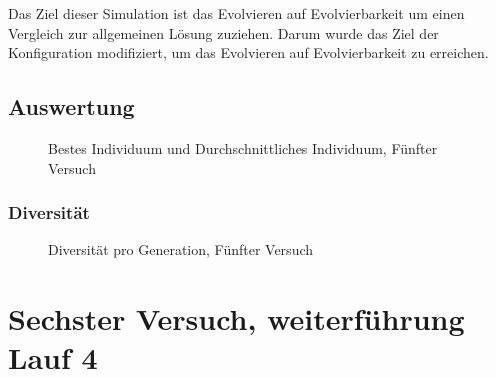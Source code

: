         Das Ziel dieser Simulation ist das Evolvieren auf Evolvierbarkeit um einen Vergleich zur allgemeinen Lösung zuziehen.
        Darum wurde das Ziel der Konfiguration modifiziert, um das Evolvieren auf Evolvierbarkeit zu erreichen.

      \subsection{Auswertung\label{sub:fifthAuswertung}}

        \begin{figure}[H]
          \centering
          
          \caption{Bestes Individuum und Durchschnittliches Individuum, Fünfter Versuch\label{fig:graphFifth}}
        \end{figure}

      \subsubsection{Diversität}

        \begin{figure}[H]
          \centering
          
          \caption{Diversität pro Generation, Fünfter Versuch\label{fig:graphDivFourth}}
        \end{figure}

    \section{Sechster Versuch, weiterführung Lauf 4 \label{sec:sixthSimulation}}
